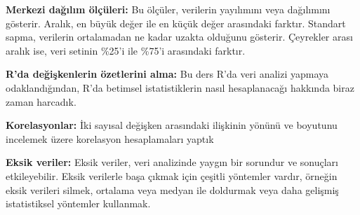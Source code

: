 \documentclass[
  letterpaper,
  DIV=11,
  numbers=noendperiod]{scrartcl}
\begin{document}
\textbf{Merkezi dağılım ölçüleri:} Bu ölçüler, verilerin yayılımını veya
dağılımını gösterir. Aralık, en büyük değer ile en küçük değer
arasındaki farktır. Standart sapma, verilerin ortalamadan ne kadar
uzakta olduğunu gösterir. Çeyrekler arası aralık ise, veri setinin
\%25'i ile \%75'i arasındaki farktır.

\textbf{R'da değişkenlerin özetlerini alma:} Bu ders R'da veri analizi
yapmaya odaklandığından, R'da betimsel istatistiklerin nasıl
hesaplanacağı hakkında biraz zaman harcadık.

\textbf{Korelasyonlar:} İki sayısal değişken arasındaki ilişkinin yönünü
ve boyutunu incelemek üzere korelasyon hesaplamaları yaptık

\textbf{Eksik veriler:} Eksik veriler, veri analizinde yaygın bir
sorundur ve sonuçları etkileyebilir. Eksik verilerle başa çıkmak için
çeşitli yöntemler vardır, örneğin eksik verileri silmek, ortalama veya
medyan ile doldurmak veya daha gelişmiş istatistiksel yöntemler
kullanmak.
\end{document}

